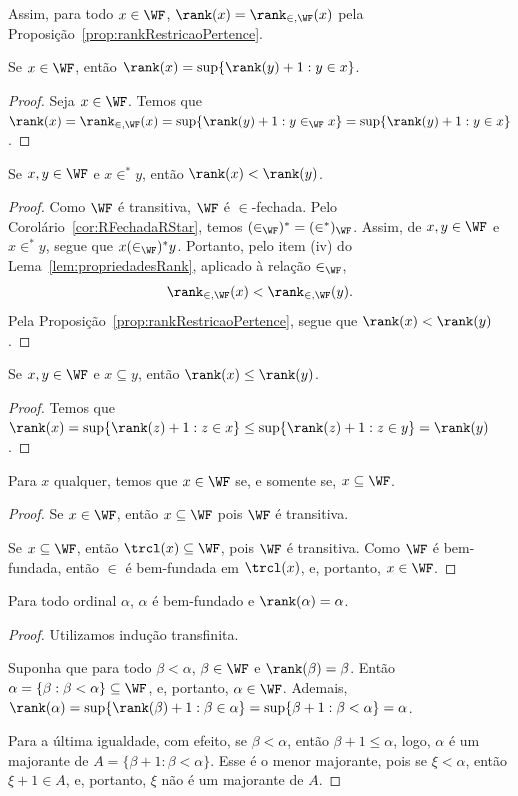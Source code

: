 Assim, para todo $x\in \WF$, $\rank(x)=\rank_{\in,\WF}(x)$ pela Proposição~\ref{prop:rankRestricaoPertence}.
\begin{corollary}[$\ZFmP$]
    Se $x\in \WF$, então $\rank(x)=\sup\{\rank(y)+1: y\in x\}$.
\end{corollary}
\begin{proof}
    Seja $x\in \WF$.
    Temos que $\rank(x)=\rank_{\in, \WF}(x)=\sup\{\rank(y)+1: y\in_{\WF} x\}=\sup\{\rank(y)+1: y\in x\}$.
\end{proof}
\begin{corollary}[$\ZFmP$]
    Se $x, y \in \WF$ e $x\in^* y$, então $\rank(x)<\rank(y)$.
\end{corollary}
\begin{proof}
    Como $\WF$ é transitiva, $\WF$ é $\in$-fechada.
    Pelo Corolário~\ref{cor:RFechadaRStar}, temos $(\in_{\WF})^*=(\in^*)_{\WF}$.
    Assim, de $x,y\in\WF$ e $x\in^* y$, segue que $x(\in_{\WF})^*y$.
    Portanto, pelo item (iv) do Lema~\ref{lem:propriedadesRank}, aplicado à relação $\in_{\WF}$,
    \[
        \rank_{\in,\WF}(x)<\rank_{\in,\WF}(y).
    \]
    Pela Proposição~\ref{prop:rankRestricaoPertence}, segue que $\rank(x)<\rank(y)$.
\end{proof}

\begin{corollary}[$\ZFmP$]
    Se $x, y \in \WF$ e $x\subseteq y$, então $\rank(x)\leq \rank(y)$.
\end{corollary}
\begin{proof}
    Temos que $\rank(x)=\sup\{\rank(z)+1: z\in x\}\leq \sup\{\rank(z)+1: z\in y\}=\rank(y)$.
\end{proof}
\begin{corollary}[$\ZFmP$]
    Para $x$ qualquer, temos que $x\in \WF$ se, e somente se, $x\subseteq \WF$.
\end{corollary}
\begin{proof}
    Se $x\in \WF$, então $x\subseteq \WF$ pois $\WF$ é transitiva.

    Se $x\subseteq \WF$, então $\trcl(x)\subseteq \WF$, pois $\WF$ é transitiva.
    Como $\WF$ é bem-fundada, então $\in$ é bem-fundada em $\trcl(x)$, e, portanto, $x\in \WF$.
\end{proof}

\begin{lemma}[$\ZFmP$]
    Para todo ordinal $\alpha$, $\alpha$ é bem-fundado e $\rank(\alpha)=\alpha$.
\end{lemma}
\begin{proof}
    Utilizamos indução transfinita.

    Suponha que para todo $\beta<\alpha$, $\beta \in \WF$ e $\rank(\beta)=\beta$.
    Então $\alpha=\{\beta: \beta<\alpha\}\subseteq \WF$, e, portanto, $\alpha\in \WF$.
    Ademais, $\rank(\alpha)=\sup\{\rank(\beta)+1: \beta\in \alpha\}=\sup\{\beta+1: \beta< \alpha\}=\alpha$.

    Para a última igualdade, com efeito, se $\beta<\alpha$, então $\beta+1\leq \alpha$, logo, $\alpha$ é um majorante de $A=\{\beta+1: \beta< \alpha\}$.
    Esse é o menor majorante, pois se $\xi<\alpha$, então $\xi+1\in A$, e, portanto, $\xi$ não é um majorante de $A$.
\end{proof}

